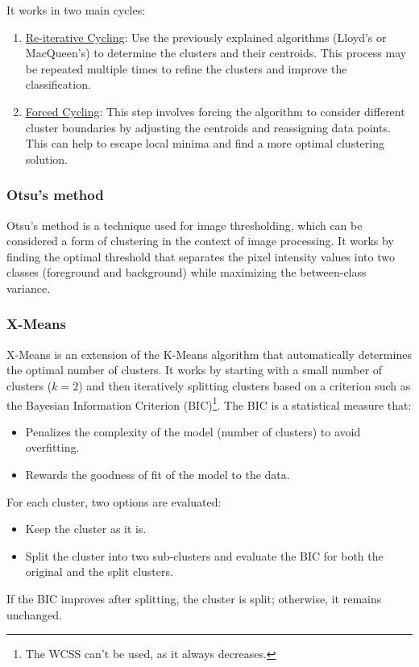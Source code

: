 It works in two main cycles:
\begin{enumerate}
    \item \ul{Re-iterative Cycling}: Use the previously explained algorithms (Lloyd's or MacQueen's) to determine the clusters and their centroids. This process may be repeated multiple times to refine the clusters and improve the classification.
    \item \ul{Forced Cycling}: This step involves forcing the algorithm to consider different cluster boundaries by adjusting the centroids and reassigning data points. This can help to escape local minima and find a more optimal clustering solution.
\end{enumerate}

\subsubsection{Otsu's method}

Otsu's method is a technique used for image thresholding, which can be considered a form of clustering in the context of image processing. It works by finding the optimal threshold that separates the pixel intensity values into two classes (foreground and background) while maximizing the between-class variance.

\subsubsection{X-Means}
X-Means is an extension of the K-Means algorithm that automatically determines the optimal number of clusters. It works by starting with a small number of clusters ($k=2$) and then iteratively splitting clusters based on a criterion such as the Bayesian Information Criterion (BIC)\footnote{The WCSS can't be used, as it always decreases.}. The BIC is a statistical measure that:
\begin{itemize}
    \item Penalizes the complexity of the model (number of clusters) to avoid overfitting.
    \item Rewards the goodness of fit of the model to the data.
\end{itemize}

For each cluster, two options are evaluated:
\begin{itemize}
    \item Keep the cluster as it is.
    \item Split the cluster into two sub-clusters and evaluate the BIC for both the original and the split clusters.
\end{itemize}
If the BIC improves after splitting, the cluster is split; otherwise, it remains unchanged.

